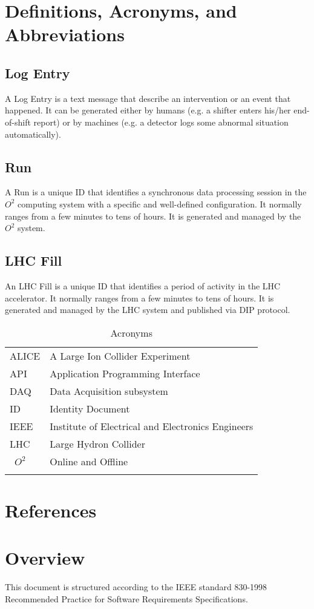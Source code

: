 \section{Definitions, Acronyms, and Abbreviations}

\subsection{Log Entry}
A Log Entry is a text message that describe an intervention or an event that happened. It can be generated either by humans (e.g. a shifter enters his/her end-of-shift report) or by machines (e.g. a detector logs some abnormal situation automatically). 

\subsection{Run}
A Run is a unique ID that identifies a synchronous data processing session in the $O^2$ computing system with a specific and well-defined configuration. It normally ranges from a few minutes to tens of hours. It is generated and managed by the $O^2$ system. 

\subsection{LHC Fill}
An LHC Fill is a unique ID that identifies a period of activity in the LHC accelerator. It normally ranges from a few minutes to tens of hours. It is generated and managed by the LHC system and published via DIP protocol. 
 
\begin{table}[h]
\begin{center}
\begin{longtable}{ll}
    ALICE & A Large Ion Collider Experiment\\
    API & Application Programming Interface\\
    DAQ & Data Acquisition subsystem \\
    ID & Identity Document\\
    IEEE & Institute of Electrical and Electronics Engineers\\
     LHC  & Large Hydron Collider\\\
     $O^2$ & Online and Offline\\
     
       & \\
    \end{longtable}
      \caption{Acronyms}
  \label{tab:acronyms}
  \end{center}
  
\end{table}




\section{References}

\section{Overview}
This document is structured according to the IEEE standard 830-1998 Recommended Practice for Software Requirements Specifications.
